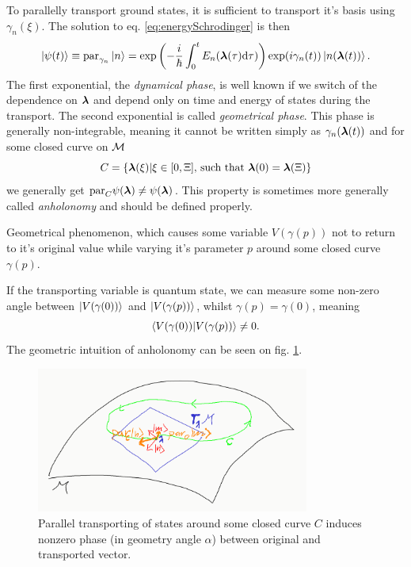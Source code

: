 To parallelly transport ground states, it is sufficient to transport it's basis using $\gamma_n(\xi)$. The solution to eq. \ref{eq:energySchrodinger} is then
\begin{equation}
    \ket{\psi(t)} \equiv \textrm{par}_{\gamma_n}\ket{n} = \exp\left(-\frac{i}{\hbar}\int_0^tE_n({\bm\lambda}(\tau)\mathrm{d}\tau)\right)\exp(i\gamma_n(t))\ket{n({\bm\lambda}(t))}.
    \label{eq:phasesOnManifold}
\end{equation}
The first exponential, the \emph{dynamical phase}, is well known if we switch of the dependence on ${\bm\lambda}$ and depend only on time and energy of states during the transport. The second exponential is called \emph{geometrical phase}. This phase is generally non-integrable, meaning it cannot be written simply as $\gamma_n({\bm\lambda}(t))$ and for some closed curve on $\mathcal{M}$
\begin{equation}
    C=\{{\bm\lambda}(\xi)|\xi\in[0,\Xi] \text{, such that }{\bm\lambda}(0)={\bm\lambda}(\Xi)\}
\end{equation} 
we generally get $\textrm{par}_C \psi({\bm\lambda})\neq \psi({\bm\lambda})$. This property is sometimes more generally called \emph{anholonomy} and should be defined properly.
\begin{definition}[Anholonomy]
    Geometrical phenomenon, which causes some variable $V(\gamma(p))$ not to return to it's original value while varying it's parameter $p$ around some closed curve $\gamma(p)$. 
\end{definition}
If the transporting variable is quantum state, we can measure some non-zero angle between $\ket{V(\gamma(0))}$ and $\ket{V(\gamma(p))}$, whilst $\gamma(p)=\gamma(0)$, meaning
$$\braket{V(\gamma(0))|V(\gamma(p))}\neq 0.$$ 
The geometric intuition of anholonomy can be seen on fig. \ref{fig:parallelTransportClosed}.

\begin{figure}[h]
    \centering
    \includegraphics[width=0.8\textwidth]{../img/parallelTransportClosedCurve.png}
\caption{Parallel transporting of states around some closed curve $C$ induces nonzero phase (in geometry angle $\alpha$) between original and transported vector.}
    \label{fig:parallelTransportClosed}
\end{figure}

